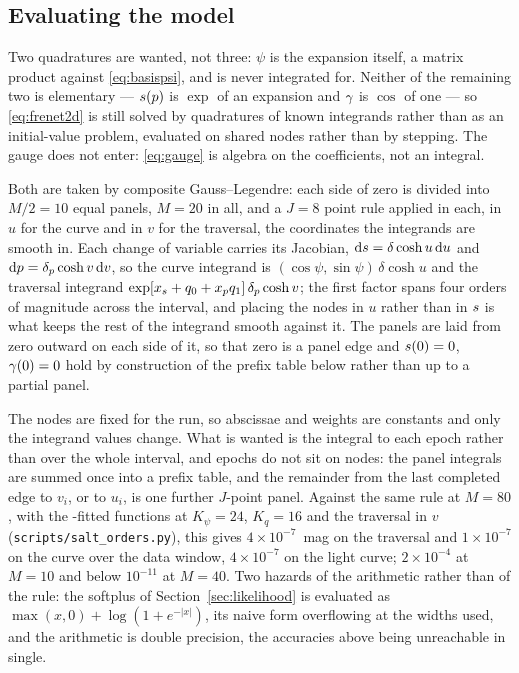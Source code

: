 \documentclass[11pt]{article}
\theoremstyle{plain}
\begin{document}
\subsection{Evaluating the model}
\label{sec:numerics}

Two quadratures are wanted, not three: $\psi$ is the expansion itself, a matrix product
against \eqref{eq:basispsi}, and is never integrated for. Neither of the remaining two is
elementary --- $s(p)$ is $\exp$ of an expansion and $\gamma$ is $\cos$ of one --- so \eqref{eq:frenet2d} is still
solved by quadratures of known integrands rather than as an initial-value problem, evaluated
on shared nodes rather than by stepping. The gauge does not enter: \eqref{eq:gauge} is
algebra on the coefficients, not an integral.

Both are taken by composite Gauss--Legendre: each side of zero is divided into $M/2 = 10$
equal panels, $M = 20$ in all, and a $J = 8$ point rule applied in each, in $u$ for the
curve and in $v$ for the traversal, the coordinates the integrands are smooth in. Each change of variable carries
its Jacobian, $\mathrm{d}s = \delta\cosh u\,\mathrm{d} u$ and $\mathrm{d}p = \delta_{p}\cosh v\,\mathrm{d} v$, so the curve integrand is
$(\cos\psi, \sin\psi)\,\delta\cosh u$ and the traversal integrand
$\exp[x_{s} + q_{0} + x_p q_{1}]\,\delta_{p}\cosh v$; the first factor spans four orders of magnitude across
the interval, and placing the nodes in $u$ rather than in $s$ is what keeps the rest of
the integrand smooth against it. The panels are laid from zero outward on each side of it,
so that zero is a panel edge and $s(0) = 0$, $\gamma(0) = 0$ hold by construction of the
prefix table below rather than up to a partial panel.

The nodes are fixed for the run, so abscissae and weights are constants and only the
integrand values change. What is wanted is the integral to each epoch rather than over the
whole interval, and epochs do not sit on nodes: the panel integrals are summed once into a
prefix table, and the remainder from the last completed edge to $v_{i}$, or to
$u_{i}$, is one further $J$-point panel. Against the same rule at $M = 80$, with the
\salt-fitted functions at $K_{\psi} = 24$, $K_{q} = 16$ and the traversal in $v$
(\texttt{scripts/salt\_orders.py}), this gives $4\times10^{-7}$~mag on the traversal and
$1\times10^{-7}$ on the curve over the data window, $4\times10^{-7}$ on the light curve;
$2\times10^{-4}$ at $M = 10$ and below $10^{-11}$ at $M = 40$. Two hazards of the arithmetic rather than of the rule: the softplus of
Section~\ref{sec:likelihood} is evaluated as $\max(x,0) + \log(1 + e^{-|x|})$, its naive
form overflowing at the widths used, and the arithmetic is double precision, the
accuracies above being unreachable in single.
\end{document}

